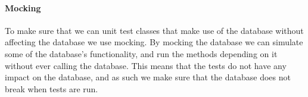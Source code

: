  \paragraph{Mocking}
 To make sure that we can unit test classes that make use of the database without affecting the database we use mocking. By mocking the database we can simulate some of the database's functionality, and run the methods depending on it without ever calling the database. This means that the tests do not have any impact on the database, and as such we make sure that the database does not break when tests are run.
 